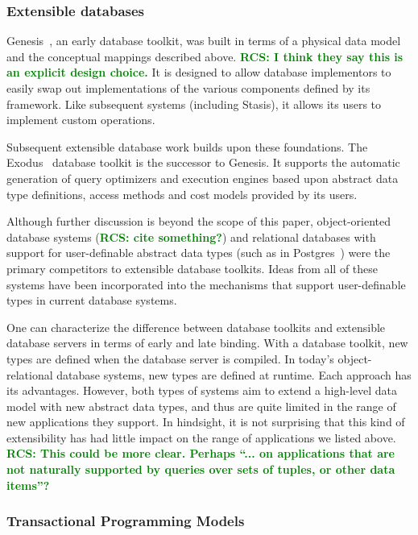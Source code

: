 \documentclass[letterpaper,twocolumn,10pt]{article}
\newcommand{\yad}{Stasis\xspace}
\newcommand{\rcs}[1]{\textcolor{green}{\bf RCS: #1}}
\begin{document}
\subsubsection{Extensible databases}

Genesis~\cite{genesis}, an early database toolkit, was built in terms
of a physical data model and the conceptual mappings described above. \rcs{I think they say this is an explicit design choice.}
It is designed to allow database implementors to easily swap out
implementations of the various components defined by its framework.
Like subsequent systems (including \yad), it allows its users to
implement custom operations.

Subsequent extensible database work builds upon these foundations.
The Exodus~\cite{exodus} database toolkit is the successor to
Genesis. It supports the automatic generation of query optimizers and
execution engines based upon abstract data type definitions, access
methods and cost models provided by its users.

Although further discussion is beyond the scope of this paper,
object-oriented database systems (\rcs{cite something?}) and relational databases with
support for user-definable abstract data types (such as in
Postgres~\cite{postgres}) were the primary competitors to extensible
database toolkits.  Ideas from all of these systems have been
incorporated into the mechanisms that support user-definable types in
current database systems.

One can characterize the difference between database toolkits and
extensible database servers in terms of early and late binding.  With
a database toolkit, new types are defined when the database server is
compiled.  In today's object-relational database systems, new types
are defined at runtime.  Each approach has its advantages.  However,
both types of systems aim to extend a high-level data model with new 
abstract data types, and thus are quite limited in the range of new 
applications they support.  In hindsight, it is not surprising that this kind of 
extensibility has had little impact on the range of applications 
we listed above. \rcs{This could be more clear.  Perhaps ``... on applications that are not naturally supported by queries over sets of tuples, or other data items''?}

\subsubsection{Transactional Programming Models}
\end{document}
